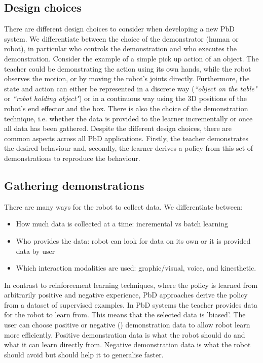 \subsection{Design choices}
There are different design choices to consider when developing a new PbD system.
We differentiate between the choice of the demonstrator (human or robot), in particular who controls the demonstration and who executes the demonstration. Consider the example of a simple pick up action of an object. The teacher could be demonstrating the action using its own hands, while the robot observes the motion, or by moving the robot's joints directly. Furthermore, the state and action can either be represented in a discrete way (\textit{``object on the table"} or \textit{``robot holding object"}) or in a continuous way using the 3D positions of the robot's end effector and the box. There is also the choice of the demonstration technique, i.e. whether the data is provided to the learner incrementally or once all data has been gathered. 
Despite the different design choices, there are common aspects across all PbD applications. Firstly, the teacher demonstrates the desired behaviour and, secondly, the learner derives a policy from this set of demonstrations to reproduce the behaviour.

\subsection{Gathering demonstrations} \label{subsec:Gathering demonstrations}
There are many ways for the robot to collect data. We differentiate between:
\begin{itemize}
    \item How much data is collected at a time: incremental vs batch learning
    \item Who provides the data: robot can look for data on its own or it is provided data by user
    \item Which interaction modalities are used: graphic/visual, voice, and kinesthetic. 
\end{itemize}

In contrast to reinforcement learning techniques, where the policy is learned from arbitrarily positive and negative experience, PbD approaches derive the policy from a dataset of supervised examples. In PbD systems the teacher provides data for the robot to learn from. This means that the selected data is 'biased'. The user can choose positive or negative (\cite{grollman2012robot}) demonstration data to allow robot learn more efficiently. Positive demonstration data is what the robot should do and what it can learn directly from. Negative demonstration data is what the robot should avoid but should help it to generalise faster.

